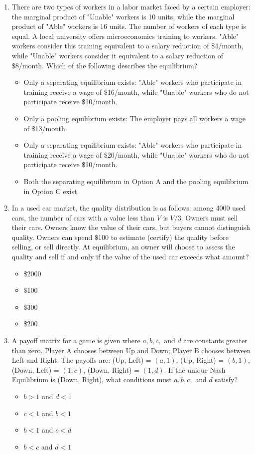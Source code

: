 \documentclass[12pt, a4paper]{article}
\begin{document}
\begin{enumerate}
    \item There are two types of workers in a labor market faced by a certain employer: the marginal product of "Unable" workers is 10 units, while the marginal product of "Able" workers is 16 units. The number of workers of each type is equal. A local university offers microeconomics training to workers. "Able" workers consider this training equivalent to a salary reduction of \$4/month, while "Unable" workers consider it equivalent to a salary reduction of \$8/month. Which of the following describes the equilibrium?
    \begin{itemize}
        \item[A.] Only a separating equilibrium exists: "Able" workers who participate in training receive a wage of \$16/month, while "Unable" workers who do not participate receive \$10/month.
        \item[B.] Only a pooling equilibrium exists: The employer pays all workers a wage of \$13/month.
        \item[C.] Only a separating equilibrium exists: "Able" workers who participate in training receive a wage of \$20/month, while "Unable" workers who do not participate receive \$10/month.
        \item[D.] Both the separating equilibrium in Option A and the pooling equilibrium in Option C exist.
    \end{itemize}

\item In a used car market, the quality distribution is as follows: among 4000 used cars, the number of cars with a value less than $V$ is $V/3$. Owners must sell their cars. Owners know the value of their cars, but buyers cannot distinguish quality. Owners can spend \$100 to estimate (certify) the quality before selling, or sell directly. At equilibrium, an owner will choose to assess the quality and sell if and only if the value of the used car exceeds what amount?
    \begin{itemize}
        \item[A.] \$2000
        \item[B.] \$100
        \item[C.] \$300
        \item[D.] \$200
    \end{itemize}

\item A payoff matrix for a game is given where $a, b, c,$ and $d$ are constants greater than zero. Player A chooses between Up and Down; Player B chooses between Left and Right. The payoffs are: (Up, Left) = $(a, 1)$, (Up, Right) = $(b, 1)$, (Down, Left) = $(1, c)$, (Down, Right) = $(1, d)$. If the unique Nash Equilibrium is (Down, Right), what conditions must $a, b, c,$ and $d$ satisfy?
    \begin{itemize}
        \item[A.] $b > 1$ and $d < 1$
        \item[B.] $c < 1$ and $b < 1$
        \item[C.] $b < 1$ and $c < d$
        \item[D.] $b < c$ and $d < 1$
    \end{itemize}


\end{enumerate}
\end{document}
